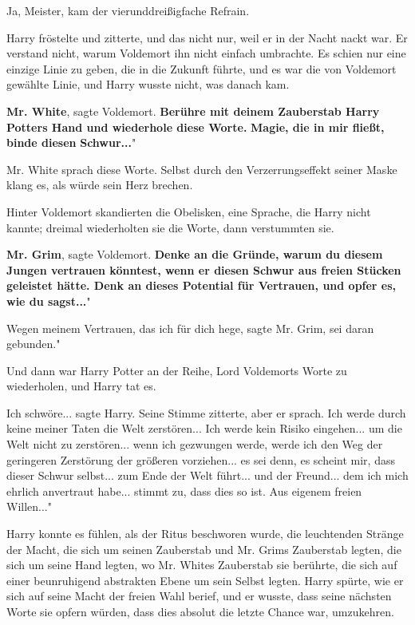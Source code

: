 \glqq{}Ja, Meister\grqq{}, kam der vierunddreißigfache Refrain.

Harry fröstelte und zitterte, und das nicht nur, weil er in der Nacht nackt war.
Er verstand nicht, warum Voldemort ihn nicht einfach umbrachte. Es schien nur
eine einzige Linie zu geben, die in die Zukunft führte, und es war die von
Voldemort gewählte Linie, und Harry wusste nicht, was danach kam.

\glqq{}\textbf{Mr. White}\grqq{}, sagte Voldemort. \glqq{}\textbf{Berühre mit
deinem Zauberstab Harry Potters Hand und wiederhole diese Worte.} \textbf{Magie,
die in mir fließt, binde diesen} \textbf{Schwur...}"

Mr. White sprach diese Worte. Selbst durch den Verzerrungseffekt seiner Maske
klang es, als würde sein Herz brechen.

Hinter Voldemort skandierten die Obelisken, eine Sprache, die Harry nicht
kannte; dreimal wiederholten sie die Worte, dann verstummten sie.

\glqq{}\textbf{Mr. Grim}\grqq{}, sagte Voldemort. \glqq{}\textbf{Denke an die
Gründe, warum du diesem Jungen vertrauen könntest, wenn er diesen Schwur aus
freien Stücken geleistet hätte. Denk an dieses Potential für Vertrauen, und
opfer es, wie du sagst...}"

\glqq{}Wegen meinem Vertrauen, das ich für dich hege\grqq{}, sagte Mr. Grim,
\glqq{}sei daran gebunden."

Und dann war Harry Potter an der Reihe, Lord Voldemorts Worte zu wiederholen,
und Harry tat es.

\glqq{}Ich schwöre...\grqq{} sagte Harry. Seine Stimme zitterte, aber er sprach.
\glqq{}Ich werde durch keine meiner Taten die Welt zerstören... Ich werde kein
Risiko eingehen... um die Welt nicht zu zerstören... wenn ich gezwungen werde,
werde ich den Weg der geringeren Zerstörung der größeren vorziehen... es sei
denn, es scheint mir, dass dieser Schwur selbst... zum Ende der Welt führt...
und der Freund... dem ich mich ehrlich anvertraut habe... stimmt zu, dass dies
so ist. Aus eigenem freien Willen..."

Harry konnte es fühlen, als der Ritus beschworen wurde, die leuchtenden Stränge
der Macht, die sich um seinen Zauberstab und Mr. Grims Zauberstab legten, die
sich um seine Hand legten, wo Mr. Whites Zauberstab sie berührte, die sich auf
einer beunruhigend abstrakten Ebene um sein Selbst legten. Harry spürte, wie er
sich auf seine Macht der freien Wahl berief, und er wusste, dass seine nächsten
Worte sie opfern würden, dass dies absolut die letzte Chance war, umzukehren.

